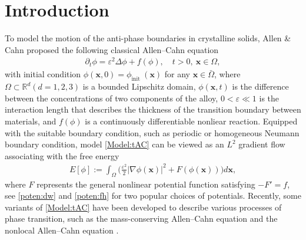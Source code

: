 \documentclass{m2an}
\newcommand{\p}{\partial}
\begin{document}
\section{Introduction}
To model the motion of the anti-phase boundaries in crystalline solids, Allen \& Cahn proposed the following classical Allen--Cahn equation \cite{Acta_Allen_1979}
\begin{equation}\label{Model:tAC}
	\begin{aligned}
		\p_t \phi   = \varepsilon^2 \Delta \phi + f( \phi ), \quad t >0, \  \mathbf{x} \in \Omega,
	\end{aligned}
\end{equation}
with initial condition $ \phi( \mathbf{x}, 0 ) = \phi_{\text {init }} ( \mathbf{x} ) $ for any $ \mathbf{x} \in \bar{\Omega} $, where $\Omega \subset \mathbb{R}^d (d = 1,2,3)$ is a bounded
Lipschitz domain, $ \phi( \mathbf{x}, t ) $ is the difference between the concentrations of two
components of the alloy, $  0 < \varepsilon \ll 1 $ is the interaction length that describes the thickness of the transition boundary between materials, and $ f(\phi)  $ is a continuously differentiable nonliear reaction. Equipped with the suitable boundary condition, such as periodic or homogeneous Neumann boundary condition, model \eqref{Model:tAC} can be viewed as an $ L^{2} $ gradient flow associating with the free energy
\begin{equation*}\label{def:energy}
	\begin{aligned}
		E[\phi] := \int_{\Omega} \Big( \frac{\varepsilon^2}{2} \vert \nabla \phi(\mathbf{x}) \vert^2 
		+ F( \phi(\mathbf{x}) ) \Big) d \mathbf{x},
	\end{aligned}
\end{equation*}
where $F$ represents the general nonlinear potential function satisfying $ - F' = f $, see \eqref{poten:dw} and \eqref{poten:fh} for two popular choices of potentials. Recently, some variants of \eqref{Model:tAC} have been developed to describe various processes of phase transition, such as the mass-conserving Allen--Cahn equation \cite{IMA_1992_Rubinstein} and the nonlocal Allen--Cahn equation \cite{FIC_2006_Bates,SINUM_Du_2019}.
\end{document}
